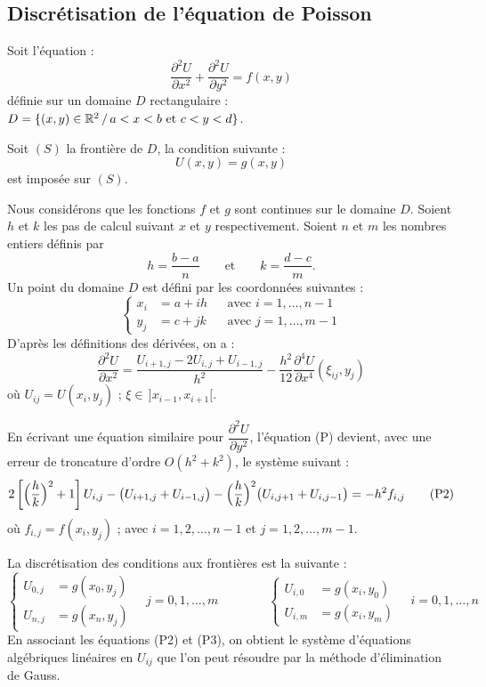 \subsection{Discrétisation de l'équation de Poisson}

Soit l'équation :
\begin{equation}
  \frac{\partial^2 U}{\partial x^2} + \frac{\partial^2 U}{\partial y^2} = f(x, y)
  \tag{P}
\end{equation}
définie sur un domaine $D$ rectangulaire :
$D = \{(x, y) \in \mathbb{R}^2 \,/\, a < x < b \text{ et } c < y < d\}$.

Soit $(S)$ la frontière de $D$, la condition suivante :
\[
  U(x, y) = g(x, y)
\]
est imposée sur $(S)$.

Nous considérons que les fonctions $f$ et $g$ sont continues sur le domaine
$D$. Soient $h$ et $k$ les pas de calcul suivant $x$ et $y$ respectivement.
Soient $n$ et $m$ les nombres entiers définis par
\[
  h = \frac{b - a}{n} \qquad\text{et}\qquad k = \frac{d - c}{m} .
\]
Un point du domaine $D$ est défini par les coordonnées suivantes :
\[
  \left\{
  \begin{aligned}
    x_i &= a + ih && \text{avec } i = 1, \dots, n-1\\
    y_j &= c + jk && \text{avec } j = 1, \dots, m-1
  \end{aligned}
  \right.
\]
D'après les définitions des dérivées, on a :
\begin{equation}
  \frac{\partial^2 U}{\partial x^2}
  = \frac{U_{i+1,j} - 2U_{i,j} + U_{i-1,j}}{h^2}
  - \frac{h^2}{12}\frac{\partial^4 U}{\partial x^4}(\xi_{ij}, y_j)
  \tag{P1}
\end{equation}
où $U_{ij} = U(x_i, y_j)$ ; $\xi \in\, ]x_{i-1}, x_{i+1}[$.

En écrivant une équation similaire pour $\dfrac{\partial^2 U}{\partial y^2}$,
l'équation (P) devient, avec une erreur de troncature d'ordre
$O(h^2 + k^2)$, le système suivant :
\begin{equation}
  2\left[\Bigl(\frac{h}{k}\Bigr)^2 + 1\right]U_{i,j} - \bigl(U_{i+1,j} + U_{i-1,j}\bigr)
  - \Bigl(\frac{h}{k}\Bigr)^2\bigl(U_{i,j+1} + U_{i,j-1}\bigr) = -h^2f_{i,j}
  \tag{P2}
\end{equation}
où $f_{i,j} = f(x_i, y_j)$ ; avec $i = 1, 2, \dots, n-1$ et
$j = 1, 2, \dots, m-1$.

La discrétisation des conditions aux frontières est la suivante :
\begin{equation}
  \left\{
  \begin{aligned}
    U_{0,j} &= g(x_0, y_j)\\
    U_{n,j} &= g(x_n, y_j)
  \end{aligned}
  \right.
  \quad j = 0, 1, \dots, m
  \qquad\qquad
  \left\{
  \begin{aligned}
    U_{i,0} &= g(x_i, y_0)\\
    U_{i,m} &= g(x_i, y_m)
  \end{aligned}
  \right.
  \quad i = 0, 1, \dots, n
  \tag{P3}
\end{equation}
En associant les équations (P2) et (P3), on obtient le système d'équations
algébriques linéaires en $U_{ij}$ que l'on peut résoudre par la méthode
d'élimination de Gauss.

